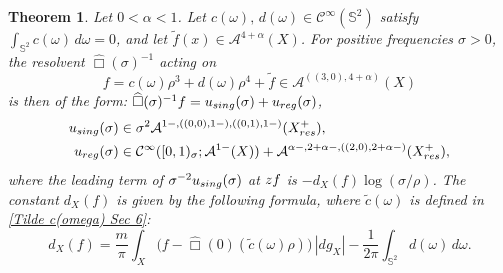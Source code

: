 \documentclass[10pt,a4paper,reqno]{amsart}
\newcommand{\CI}{\mathcal{C}^\infty}
\newcommand{\A}{\mathcal{A}}
\newcommand{\ti}{\tilde}
\renewcommand{\S}{{\mathbb S}}
\newtheorem{theorem}{Theorem}[section]
\theoremstyle{definition}
\theoremstyle{remark}
\numberwithin{equation}{section}
\newcommand{\wh}{\widehat}
\begin{document}
\begin{theorem}
\label{thm:resolvent expansion Sec 6}
     Let $0<\alpha<1$. Let $c(\omega),\,d(\omega)\in \CI(\S^2)$ satisfy $\int_{\S^2} c(\omega)\,d\omega = 0$, and let $\ti f(x) \in \A^{4+\alpha}(X)$. For positive frequencies $\sigma>0$, the resolvent $\wh\Box(\sigma)^{-1}$ acting on 
     \[ 
     	f = c(\omega)\rho^3 + d(\omega)\rho^4 + \tilde{f} \in \A^{((3,0),4+\alpha)}(X)
     \]
    is then of the form: $\wh\Box(\sigma)^{-1}f = u_{\rm sing}(\sigma) + u_{\rm reg}(\sigma)$,
      \begin{align*}
         u_{\rm sing}(\sigma) &\in \sigma^2\A^{1-,((0,0),1-),((0,1),1-)}(X^+_{\rm res}), \\
        u_{\rm reg}(\sigma) &\in \CI([0,1)_\sigma;\A^{1-}(X)) + \A^{\alpha-,2+\alpha-,((2,0),2+\alpha-)}(X^+_{\rm res}), 
      \end{align*}
      where the leading term of $\sigma^{-2}u_{\rm sing}(\sigma)$ at ${\rm zf}$ is $-d_X(f)\log(\sigma/\rho)$. The constant $d_X(f)$ is given by the following formula, where $\tilde{c}(\omega)$ is defined in \eqref{Tilde c(omega) Sec 6}:
      \begin{equation}
          d_X(f) = \frac{m}{\pi}\int_X \big(f-\wh\Box(0)(\tilde{c}(\omega)\rho)\big)\, |dg_X| - \frac{1}{2\pi}\int_{\S^2} d(\omega)\,d\omega .
          \label{eq:d(f)}
      \end{equation}
    \end{theorem}
\end{document}
